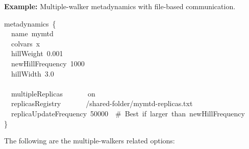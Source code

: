 \noindent\textbf{Example:} Multiple-walker metadynamics with file-based communication.\\
\begin{cvexampleinput}
\-metadynamics~\{\\
\-\-~~name~mymtd\\
\-\-~~colvars~x\\
\-\-~~hillWeight~0.001\\
\-\-~~newHillFrequency~1000\\
\-\-~~hillWidth~3.0\\
\-\-~~\\
\-\-~~multipleReplicas~~~~~~~on\\
\-\-~~replicasRegistry~~~~~~~/shared-folder/mymtd-replicas.txt\\
\-\-~~replicaUpdateFrequency~50000~~\#~Best~if~larger~than~newHillFrequency\\
\-\}
\end{cvexampleinput}

The following are the multiple-walkers related options:

